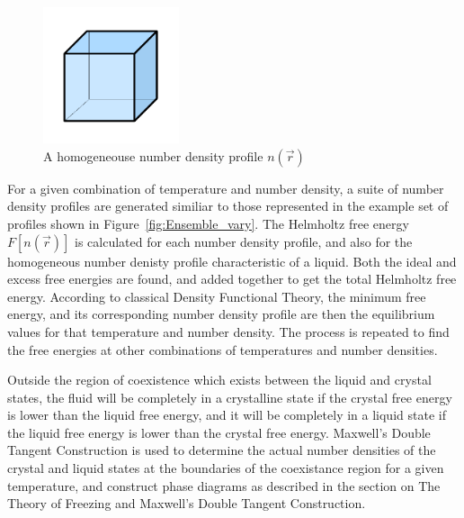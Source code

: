 \documentclass[double,12pt]{beavtex}
\begin{document}
 \begin{figure}[h!]
    \centering
    \includegraphics[height=4cm]{figs/homogeneous_bold-box.pdf}
    \caption{A homogeneouse number density profile $n(\vec{r})$}
    \label{fig:homogen_denisty}
  \end{figure}   


For a given combination of temperature and number density, a suite of number 
density profiles are generated similiar to those represented in the example 
set of profiles shown in Figure~\ref{fig:Ensemble_vary}. 
The Helmholtz free energy $F[n(\vec{r})]$ is calculated for each number 
density profile, and also for the homogeneous number denisty profile 
characteristic of a liquid. Both the ideal and excess free energies are 
found, and added together to get the total Helmholtz free energy.
According to classical Density Functional Theory, the minimum free energy, 
and its corresponding number density profile are then the equilibrium values 
for that temperature and number density.
The process is repeated to find the free energies at other combinations 
of temperatures and number densities. 

Outside the region of coexistence which exists between the liquid and 
crystal states, the fluid will be completely in a crystalline state if the 
crystal free energy is lower than the liquid free energy, and it will be 
completely in a liquid state if the liquid free energy is lower than 
the crystal free energy. Maxwell's Double Tangent Construction is used 
to determine the actual number densities of the crystal and liquid states
at the boundaries of the coexistance region for a given temperature, 
and construct phase diagrams as described in the section on The Theory of
Freezing and Maxwell's Double Tangent Construction.
\end{document}
